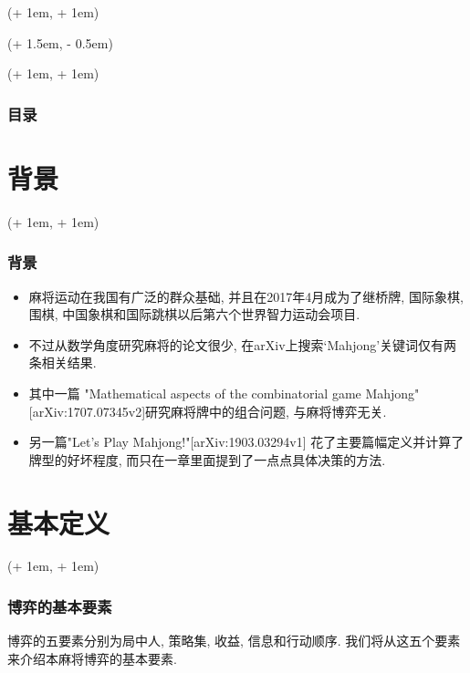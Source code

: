 \documentclass[xcolor=dvipsnames]{ctexbeamer}
\title{\TITLE}
\author{\AUTHOR}
\date{\tdyear\dateseparator\tdmonth\dateseparator\tdday\hspace{1em}\tdtime}
\institute{\INSTITUTE}
\newcommand{\FrameTextCrono}[1]{
    \begin{textblock*}{\paperwidth}(\textwidth + 1em, \textheight + 1em)
        #1
    \end{textblock*}
}
\newcommand{\FrameTextResetCrono}[1]{
    \begin{textblock*}{\paperwidth}(\textwidth + 1.5em, \textheight - 0.5em)
        #1
    \end{textblock*}
}
\newcommand{\ResetCronoBox}{\resetcrono{\fbox{reset}}}
\let\oldframe\frame
\let\oldendframe\endframe
\renewenvironment{frame}
    {\oldframe\FrameTextCrono{\small\color{blue}{\crono}}}
    {\oldendframe}
\let\oldtitlepage\titlepage
\renewcommand{\titlepage}{\oldtitlepage\FrameTextResetCrono{\ResetCronoBox}}
\begin{document}

    \begin{frame}
        \initclock
        \titlepage
    \end{frame}
    
    
    \begin{frame}
        \frametitle{目录}
        \tableofcontents
    \end{frame}

    
    \section{背景}

    \begin{frame}
        \frametitle{背景}
        \begin{itemize}
            \item 麻将运动在我国有广泛的群众基础, 并且在2017年4月成为了继桥牌,
                国际象棋, 围棋, 中国象棋和国际跳棋以后第六个世界智力运动会项目.
            \item 不过从数学角度研究麻将的论文很少,
                在arXiv上搜索`Mahjong'关键词仅有两条相关结果.
            \item 其中一篇
                "Mathematical aspects of the combinatorial game Mahjong"
                [arXiv:1707.07345v2]研究麻将牌中的组合问题,
                与麻将博弈无关.
            \item 另一篇"Let's Play Mahjong!"[arXiv:1903.03294v1]
                花了主要篇幅定义并计算了牌型的好坏程度,
                而只在一章里面提到了一点点具体决策的方法.
        \end{itemize}
    \end{frame}

    \section{基本定义}

    \begin{frame}
        \frametitle{博弈的基本要素}
        博弈的五要素分别为局中人, 策略集, 收益, 信息和行动顺序.
        我们将从这五个要素来介绍本麻将博弈的基本要素.
    \end{frame}
\end{document}
